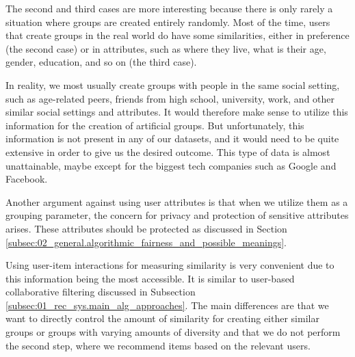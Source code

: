 The second and third cases are more interesting because there is only rarely a situation where groups are created entirely randomly. Most of the time, users that create groups in the real world do have some similarities, either in preference (the second case) or in attributes, such as where they live, what is their age, gender, education, and so on (the third case).

In reality, we most usually create groups with people in the same social setting, such as age-related peers, friends from high school, university, work, and other similar social settings and attributes. It would therefore make sense to utilize this information for the creation of artificial groups. But unfortunately, this information is not present in any of our datasets, and it would need to be quite extensive in order to give us the desired outcome. This type of data is almost unattainable, maybe except for the biggest tech companies such as Google and Facebook.

Another argument against using user attributes is that when we utilize them as a grouping parameter, the concern for privacy and protection of sensitive attributes arises. These attributes should be protected as discussed in Section \ref{subsec:02_general.algorithmic_fairness_and_possible_meanings}.

Using user-item interactions for measuring similarity is very convenient due to this information being the most accessible. It is similar to user-based collaborative filtering discussed in Subsection \ref{subsec:01_rec_sys.main_alg_approaches}. The main differences are that we want to directly control the amount of similarity for creating either similar groups or groups with varying amounts of diversity and that we do not perform the second step, where we recommend items based on the relevant users.


